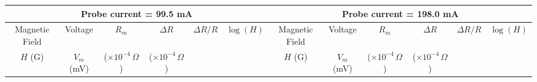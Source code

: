 \begin{table*}[]
    \centering
    \begin{tabular}{|cccccc|cccccc|}
    \hline
        \multicolumn{6}{|c|}{Probe current = 99.5 mA} & \multicolumn{6}{c|}{Probe current = 198.0 mA} \\ \hline
        \multicolumn{1}{|c|}{Magnetic Field} & \multicolumn{1}{c|}{Voltage} & \multicolumn{1}{c|}{$R_m$} & \multicolumn{1}{c|}{$\Delta R$} & \multicolumn{1}{c|}{$\Delta R/R$} & $\log (H)$ & \multicolumn{1}{c|}{Magnetic Field} & \multicolumn{1}{c|}{Voltage} & \multicolumn{1}{c|}{$R_m$} & \multicolumn{1}{c|}{$\Delta R$} & \multicolumn{1}{c|}{$\Delta R/R$} & $\log (H)$ \\
        \multicolumn{1}{|c|}{$H$ (G)} & \multicolumn{1}{c|}{$V_m$ (mV)} & \multicolumn{1}{c|}{($\times 10^{-4}\,\Omega$)} & \multicolumn{1}{c|}{($\times 10^{-4}\,\Omega$)} & \multicolumn{1}{c|}{} &  & \multicolumn{1}{c|}{$H$ (G)} & \multicolumn{1}{c|}{$V_m$ (mV)} & \multicolumn{1}{c|}{($\times 10^{-4}\,\Omega$)} & \multicolumn{1}{c|}{($\times 10^{-4}\,\Omega$)} & \multicolumn{1}{c|}{} &  \\ \hline
       

\end{tabular}
\end{table*}
